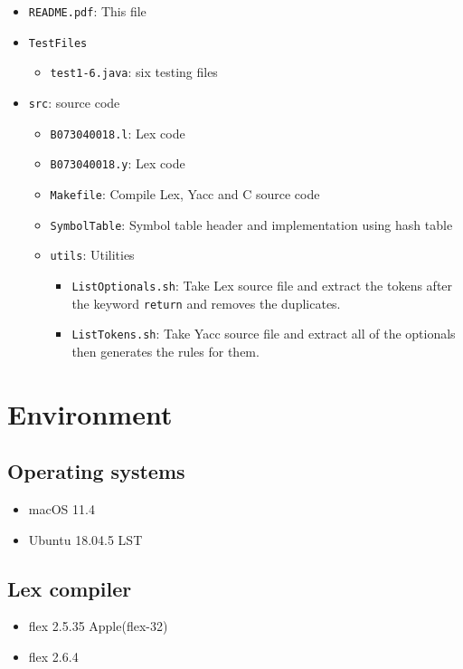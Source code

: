 \documentclass[12pt]{article}
\begin{document}
\begin{itemize}
    \item \texttt{README.pdf}: This file
    \item \texttt{TestFiles}
    \begin{itemize}
	\item \texttt{test1-6.java}: six testing files
    \end{itemize}
    \item \texttt{src}: source code
    \begin{itemize}
	\item \texttt{B073040018.l}: Lex code
	\item \texttt{B073040018.y}: Lex code
	\item \texttt{Makefile}: Compile Lex, Yacc and C source code
	\item \texttt{SymbolTable}: Symbol table header and implementation using hash table
	\item \texttt{utils}: Utilities
	\begin{itemize}
	    \item \texttt{ListOptionals.sh}: Take Lex source file and extract the tokens after the keyword \texttt{return} and removes the duplicates.
	    \item \texttt{ListTokens.sh}: Take Yacc source file and extract all of the optionals then generates the rules for them.
	\end{itemize}
    \end{itemize}
\end{itemize}

\section{Environment}
\subsection{Operating systems}
\begin{itemize}
    \item macOS 11.4
    \item Ubuntu 18.04.5 LST
\end{itemize}
\subsection{Lex compiler}
\begin{itemize}
    \item flex 2.5.35 Apple(flex-32)
    \item flex 2.6.4
\end{itemize}
\end{document}

